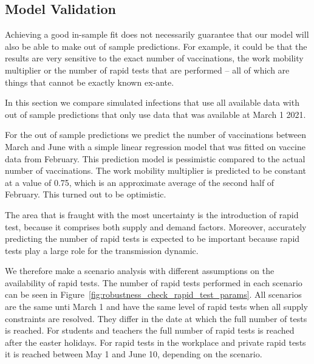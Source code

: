 \subsection{Model Validation}
\label{subsec:model_validation}

Achieving a good in-sample fit does not necessarily guarantee that our model will also
be able to make out of sample predictions. For example, it could be that the results
are very sensitive to the exact number of vaccinations, the work mobility multiplier
or the number of rapid tests that are performed -- all of which are things that cannot
be exactly known ex-ante.

In this section we compare simulated infections that use all available data with
out of sample predictions that only use data that was available at March 1 2021.

For the out of sample predictions we predict the number of vaccinations between March
and June with a simple linear regression model that was fitted on vaccine data from
February. This prediction model is pessimistic compared to the actual number of
vaccinations. The work mobility multiplier is predicted to be constant at a value of
0.75, which is an approximate average of the second half of February. This turned out
to be optimistic.

The area that is fraught with the most uncertainty is the introduction of rapid test,
because it comprises both supply and demand factors. Moreover, accurately predicting
the number of rapid tests is expected to be important because rapid tests play a large
role for the transmission dynamic.

We therefore make a scenario analysis with different assumptions on the availability
of rapid tests. The number of rapid tests performed in each scenario can be seen in
Figure~\ref{fig:robustness_check_rapid_test_params}. All scenarios are the same
unti March 1 and have the same level of rapid tests when all supply constraints are
resolved. They differ in the date at which the full number of tests is reached. For
students and teachers the full number of rapid tests is reached after the easter
holidays. For rapid tests in the workplace and private rapid tests it is reached between
May 1 and June 10, depending on the scenario.


